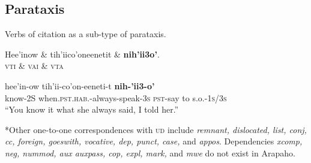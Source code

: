 \documentclass{handout}
\begin{document}
\begin{multicols}{2}
\subsection{Parataxis}
\footnotesize
\begin{exe}
\ex \label{cite} Verbs of citation as a sub-type of parataxis. %
\begin{dependency}
\begin{deptext}
Hee'inow       \& tih'iico'oneenetit                     \& \textbf{nih'ii3o'}.\\
\textsc{vti} \& \textsc{vai} \& \textsc{vta}\\
\end{deptext}
\end{dependency}
\gll
hee'in-ow {tih'ii-co'on-eeneti-t} \textbf{nih-'ii3-o'}\\
know-2S {when.\textsc{pst.hab.}-always-speak-\textsc{3s}} {\textsc{pst}-say to s.o.-\textsc{1s/3s}}\\
\trans ``You know it what she always said, I told her.''
\end{exe}

\footnotesize{*Other one-to-one correspondences with \textsc{ud} include \textit{remnant, dislocated, list, conj, cc, foreign, goeswith, vocative, dep, punct, case,} and \textit{appos}. Dependencies \textit{xcomp, neg, nummod, aux auxpass, cop, expl, mark,} and \textit{mwe } do not exist in Arapaho.}

\end{multicols}
\end{document}
